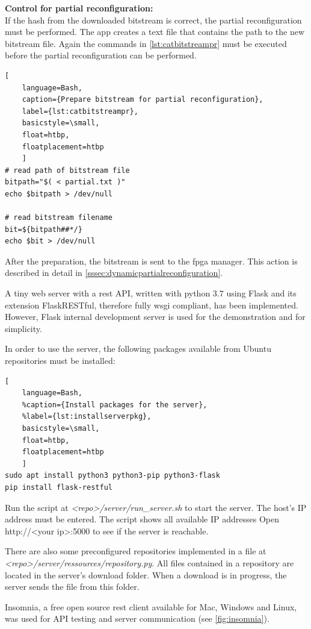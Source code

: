 \textbf{Control for partial reconfiguration:}\\
If the hash from the downloaded bitstream is correct, the partial reconfiguration must be performed. The app creates a text file that contains the path to the new bitstream file. Again the commands in \cref{lst:catbitstreampr} must be executed before the partial reconfiguration can be performed. 
\begin{lstlisting}[
	language=Bash,
	caption={Prepare bitstream for partial reconfiguration},
	label={lst:catbitstreampr},
	basicstyle=\small,
	float=htbp,
	floatplacement=htbp
	]
# read path of bitstream file 
bitpath="$( < partial.txt )"
echo $bitpath > /dev/null

# read bitstream filename
bit=${bitpath##*/}
echo $bit > /dev/null
\end{lstlisting}

After the preparation, the bitstream is sent to the \gls{fpga} manager. This action is described in detail in \cref{sssec:dynamicpartialreconfiguration}.

\label{ssssec:server}
A tiny web server with a \gls{rest} API, 
written with python $3.7$ using Flask and its extension FlaskRESTful, therefore fully \gls{wsgi} compliant, has been implemented. However, Flask internal development server is used for the demonstration and for simplicity.

In order to use the server, the following packages available from Ubuntu repositories must be installed: 
\begin{lstlisting}[
	language=Bash,
	%caption={Install packages for the server},
	%label={lst:installserverpkg},
	basicstyle=\small,
	float=htbp,
	floatplacement=htbp
	]
sudo apt install python3 python3-pip python3-flask
pip install flask-restful 
\end{lstlisting}

Run the script at \emph{<repo>/server/run\_server.sh} to start the server. The host's IP address must be entered. The script shows all available IP addresses
Open http://<your ip>:5000 to see if the server is reachable.

There are also some preconfigured repositories implemented in a file at \emph{<repo>/server/ressources/repository.py}.
All files contained in a repository are located in the server's download folder. When a download is in progress, the server sends the file from this folder.

\label{ssssec:serverapi}
Insomnia, a free open source \gls{rest} client available for Mac, Windows and Linux, was used for API testing and server communication (see \cref{fig:insomnia}).

